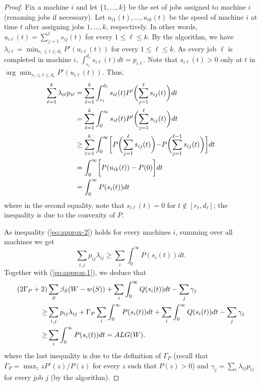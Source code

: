 \documentclass[11pt,a4paper]{article}
\begin{document}
\begin{proof}
Fix a machine $i$ and let $\{1, \ldots, k\}$ be the set of jobs assigned to machine $i$ (renaming jobs if 
necessary).
Let $u_{i1}(t), \ldots, u_{ik}(t)$ be the speed of machine $i$ at time $t$ after assigning 
jobs $1, \ldots, k$, respectively. In other words, $u_{i\ell}(t) = \sum_{j=1}^{\ell} s_{ij}(t)$ for every
$1 \leq \ell \leq k$. By the algorithm, we have 
$\lambda_{i\ell} = \min_{r_{\ell} \leq t \leq d_{\ell}} P'(u_{i\ell}(t))$ for every $1 \leq \ell \leq k$.
As every job $\ell$ is completed in machine $i$, $\int_{r_{\ell}}^{d_{\ell}} s_{i\ell}(t)dt = p_{i\ell}$.
Note that $s_{i\ell}(t) > 0$ only at $t$ in $\arg \min_{r_{\ell} \leq t \leq d_{\ell}} P'(u_{i\ell}(t))$.
Thus,
\begin{align}	\label{eq:approx-2}
\sum_{\ell=1}^{k} \lambda_{i\ell}p_{i\ell} 
	&= \sum_{\ell=1}^{k} \int_{r_{\ell}}^{d_{\ell}} s_{i\ell}(t)P'\biggl( \sum_{j=1}^{\ell} s_{ij}(t) \biggl)dt \notag\\
	&= \sum_{\ell=1}^{k} \int_{0}^{\infty} s_{i\ell}(t)P'\biggl( \sum_{j=1}^{\ell} s_{ij}(t) \biggl)dt	\notag \\
&\geq  \sum_{\ell=1}^{k} \int_{0}^{\infty} 
			\biggl[P\biggl( \sum_{j=1}^{\ell} s_{ij}(t) \biggl) - P\biggl( \sum_{j=1}^{\ell-1} s_{ij}(t) \biggl)\biggl] dt \notag \\
	 &=  \int_{0}^{\infty} \biggl[P(u_{ik}(t)) - P(0) \biggl]dt \notag \\
	 &= \int_{0}^{\infty} P(s_{i}(t))dt
\end{align}
where in the second equality, note that $s_{i\ell}(t) = 0$ for $t \notin [r_{\ell},d_{\ell}]$;
the inequality is due to the convexity of $P$.

As inequality (\ref{eq:approx-2}) holds for every machines $i$, summing over all machines we get
$$
\sum_{i,j} p_{ij}\lambda_{ij} \geq \sum_{i}  \int_{0}^{\infty} P(s_{i}(t))dt.
$$
Together with (\ref{eq:approx-1}), we deduce that
\begin{align*}
(2 \Gamma_{P} + 2)& \sum_{S} \beta_{S} (W - w(S)) + \sum_{i}\int_{0}^{\infty} Q(s_{i}(t)) dt - \sum_{j} \gamma_{j} \\
\geq & \sum_{i,j} p_{ij}\lambda_{ij} + \Gamma_{P} \sum_{i}  \int_{0}^{\infty} P(s_{i}(t))dt 
+ \sum_{i}\int_{0}^{\infty} Q(s_{i}(t)) dt - \sum_{j} \gamma_{j}\notag \\
\geq & \sum_{i}  \int_{0}^{\infty} P(s_{i}(t))dt
= ALG(W).
\end{align*}
where the last inequality is due to the definition of $\Gamma_{P}$ 
(recall that $\Gamma_{P} = \max_{z} zP'(z)/P(z)$ for every $z$ such that $P(z) > 0$) and 
$\gamma_{j} = \sum_{i} \lambda_{ij}p_{ij}$ for every job $j$ (by the algorithm).
\end{proof}
\end{document}
